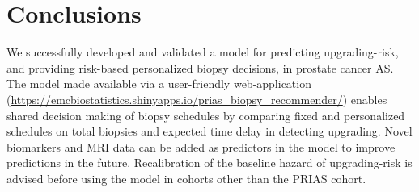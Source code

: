 \section{Conclusions}
We successfully developed and validated a model for predicting upgrading-risk, and providing risk-based personalized biopsy decisions, in prostate cancer AS. The model made available via a user-friendly web-application (\url{https://emcbiostatistics.shinyapps.io/prias_biopsy_recommender/}) enables shared decision making of biopsy schedules by comparing fixed and personalized schedules on total biopsies and expected time delay in detecting upgrading. Novel biomarkers and MRI data can be added as predictors in the model to improve predictions in the future. Recalibration of the baseline hazard of upgrading-risk is advised before using the model in cohorts other than the PRIAS cohort.